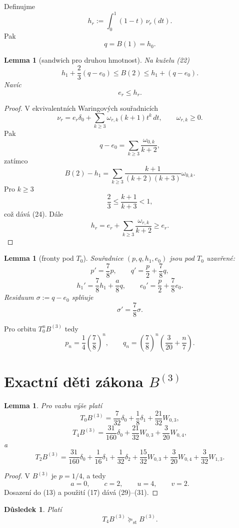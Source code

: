 \documentclass[11pt,a4paper]{article}
\newtheorem{lemma}[theorem]{Lemma}
\newtheorem{corollary}[theorem]{Důsledek}
\theoremstyle{definition}
\theoremstyle{remark}
\theoremstyle{plain}
\newcommand{\st}{\mathrm{st}}
\begin{document}
Definujme
\[
h_r:=\int_0^1(1-t)\,\nu_r(dt).
\tag{23}
\]
Pak
\[
q=B(1)=h_0.
\]

\begin{lemma}[sandwich pro druhou hmotnost]
Na kuželu (22)
\[
\boxed{
h_1+\frac23(q-e_0)
\le B(2)
\le h_1+(q-e_0).
}
\tag{24}
\]
Navíc
\[
e_r\le h_r.
\tag{25}
\]
\end{lemma}

\begin{proof}
V ekvivalentních Waringových souřadnicích
\[
\nu_r=e_r\delta_0+\sum_{k\ge3}\omega_{r,k}(k+1)t^k\,dt,
\qquad \omega_{r,k}\ge0.
\]
Pak
\[
q-e_0=\sum_{k\ge3}\frac{\omega_{0,k}}{k+2},
\]
zatímco
\[
B(2)-h_1
=
\sum_{k\ge3}
\frac{k+1}{(k+2)(k+3)}\omega_{0,k}.
\]
Pro $k\ge3$
\[
\frac23\le\frac{k+1}{k+3}<1,
\]
což dává (24). Dále
\[
h_r=e_r+\sum_{k\ge3}\frac{\omega_{r,k}}{k+2}\ge e_r.
\]
\end{proof}

\begin{lemma}[fronty pod $T_0$]
Souřadnice $(p,q,h_1,e_0)$ jsou pod $T_0$ uzavřené:
\[
p'=\frac78p,\qquad
q'=\frac p2+\frac78q,
\]
\[
h_1'=\frac78h_1+\frac a8q,
\qquad
e_0'=\frac p2+\frac78e_0.
\tag{26}
\]
Residuum $\sigma:=q-e_0$ splňuje
\[
\boxed{\sigma'=\frac78\sigma.}
\tag{27}
\]
\end{lemma}

Pro orbitu $T_0^nB^{(3)}$ tedy
\[
p_n=\frac14\left(\frac78\right)^n,
\qquad
q_n=
\left(\frac78\right)^n
\left(\frac3{20}+\frac n7\right).
\tag{28}
\]

\section{Exactní děti zákona $B^{(3)}$}

\begin{lemma}
Pro vazbu výše platí
\[
T_0B^{(3)}
=
\frac7{32}\delta_0+
\frac18\delta_1+
\frac{21}{32}W_{0,3},
\tag{29}
\]
\[
T_4B^{(3)}
=
\frac{31}{160}\delta_0+
\frac{21}{32}W_{0,3}
+\frac3{20}W_{0,4},
\tag{30}
\]
a
\[
T_2B^{(3)}
=
\frac{31}{160}\delta_0+
\frac1{16}\delta_1+
\frac1{32}\delta_2+
\frac{15}{32}W_{0,3}
+\frac3{20}W_{0,4}
+\frac3{32}W_{1,3}.
\tag{31}
\]
\end{lemma}

\begin{proof}
V $B^{(3)}$ je $p=1/4$, a tedy
\[
a=0,\qquad c=2,\qquad u=4,\qquad v=2.
\]
Dosazení do (13) a použití (17) dává (29)--(31).
\end{proof}

\begin{corollary}
Platí
\[
T_4B^{(3)}\succeq_{\st}B^{(3)}.
\tag{32}
\]
\end{corollary}
\end{document}

